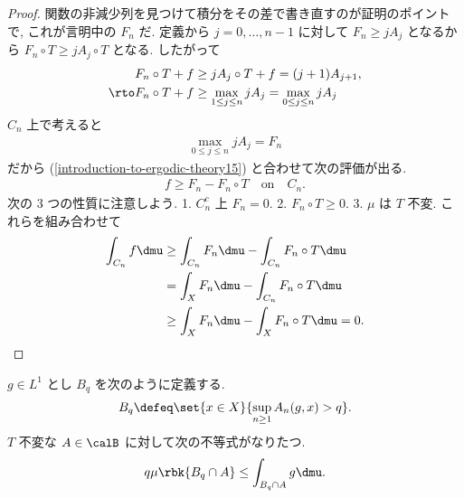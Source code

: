 \documentclass[openany, a4paper, oneside]{jsbook}
\begin{document}
\begin{proof}
関数の非減少列を見つけて積分をその差で書き直すのが証明のポイントで, これが言明中の $F_n$ だ.
定義から $j = 0, \dots, n-1$ に対して $F_n \geq j A_j$ となるから $F_n \circ T \geq j A_j \circ T$ となる.
したがって
\begin{align}
 F_n \circ T + f
 &\geq
 j A_j \circ T + f
 =
 (j+1) A_{j+1}, \\
 \rto
 F_n \circ T + f
 &\geq
 \max_{1 \leq j \leq n} j A_j
 =
 \max_{0 \leq j \leq n} j A_j \label{introduction-to-ergodic-theory15}
\end{align}
$C_n$ 上で考えると
\begin{align}
 \max_{0 \leq j \leq n} j A_j
 =
 F_n
\end{align}
だから (\ref{introduction-to-ergodic-theory15}) と合わせて次の評価が出る.
\begin{align}
 f
 \geq
 F_n - F_n \circ T \quad \text{on} \quad C_n.
 \end{align}
次の 3 つの性質に注意しよう.
1. $C_n^{c}$ 上 $F_n = 0$.
2. $F_n \circ T \geq 0$.
3. $\mu$ は $T$ 不変.
これらを組み合わせて
\begin{align}
 \int_{C_n} f \dmu
 &\geq
 \int_{C_n} F_n \dmu - \int_{C_n} F_n \circ T \dmu \\
 &=
 \int_X F_n \dmu - \int_{C_n} F_n \circ T \dmu \\
 &\geq
 \int_X F_n \dmu - \int_X F_n \circ T \dmu
 = 0.
\end{align}
\end{proof}
\begin{cor}\label{introduction-to-ergodic-theory3}
$g \in L^1$ とし $B_{q}$ を次のように定義する.
\begin{align}
 B_{q}
 \defeq
 \set{x \in X}{\sup_{n \geq 1} A_n(g, x) > q}.
\end{align}
$T$ 不変な $A \in \calB$ に対して次の不等式がなりたつ.
\begin{align}
 q \mu \rbk{B_{q} \cap A}
 \leq
 \int_{B_{q} \cap A} g \dmu.
\end{align}
\end{cor}
\end{document}
